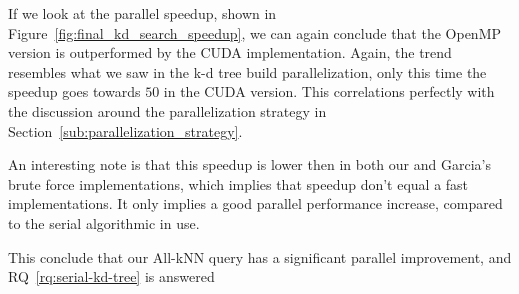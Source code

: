 If we look at the parallel speedup, shown in Figure~\ref{fig:final_kd_search_speedup}, we can again conclude that the OpenMP version is outperformed by the CUDA implementation. Again, the trend resembles what we saw in the k-d tree build parallelization, only this time the speedup goes towards $50$ in the CUDA version. This correlations perfectly with the discussion around the parallelization strategy in Section~\ref{sub:parallelization_strategy}.      

An interesting note is that this speedup is lower then in both our and Garcia's\cite{Garcia2008} brute force implementations, which implies that speedup don't equal a fast implementations. It only implies a good parallel performance increase, compared to the serial algorithmic in use.

This conclude that our All-kNN query has a significant parallel improvement, and RQ~\ref{rq:serial-kd-tree} is answered  
